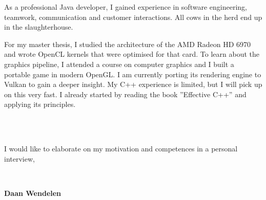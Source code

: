 \documentclass[11pt,a4paper,arial]{moderncv}        %
\begin{document}
As a professional Java developer, I gained experience in software engineering, teamwork, communication and customer interactions. All cows
in the herd end up in the slaughterhouse. 

For my master thesis, I studied
the architecture of the AMD Radeon HD 6970 and wrote OpenCL kernels that were optimised for that card. To learn about the graphics pipeline, I attended a course
on computer graphics and I built a portable game in modern OpenGL. I am currently porting its rendering engine to Vulkan to gain a deeper insight. My C++ experience is limited,
but I will pick up on this very fast. I already started by reading the book ''Effective C++'' and applying its principles.

~\\
~

I would like to elaborate on my motivation and competences in a personal interview,


~

\textbf {Daan Wendelen}

\makeletterclosing
\end{document}
